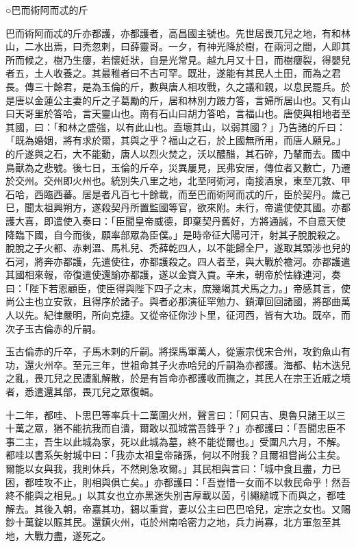 
\begin{pinyinscope}

 ○巴而術阿而忒的斤



 巴而術阿而忒的斤亦都護，亦都護者，高昌國主號也。先世居畏兀兒之地，有和林山，二水出焉，曰禿忽剌，曰薛靈哥。一夕，有神光降於樹，在兩河之間，人即其所而候之，樹乃生癭，若懷妊狀，自是光常見。越九月又十日，而樹癭裂，得嬰兒者五，土人收養之。其最稚者曰不古可罕。既壯，遂能有其民人土田，而為之君長。傳三十餘君，是為玉倫的斤，數與唐人相攻戰，久之議和親，以息民罷兵。於是唐以金蓮公主妻的斤之子葛勵的斤，居和林別力跛力答，言婦所居山也。又有山曰天哥里於答哈，言天靈山也。南有石山曰胡力答哈，言福山也。唐使與相地者至其國，曰：「和林之盛強，以有此山也。盍壞其山，以弱其國？」乃告諸的斤曰：「既為婚姻，將有求於爾，其與之乎？福山之石，於上國無所用，而唐人願見。」的斤遂與之石，大不能動，唐人以烈火焚之，沃以醲醋，其石碎，乃輦而去。國中鳥獸為之悲號。後七日，玉倫的斤卒，災異屢見，民弗安居，傳位者又數亡，乃遷於交州。交州即火州也。統別失八里之地，北至阿術河，南接酒泉，東至兀敦、甲石哈，西臨西蕃。居是者凡百七十餘載，而至巴而術阿而忒的斤，臣於契丹。歲己巳，聞太祖興朔方，遂殺契丹所置監國等官，欲來附。未行，帝遣使使其國。亦都護大喜，即遣使入奏曰：「臣聞皇帝威德，即棄契丹舊好，方將通誠，不自意天使降臨下國，自今而後，願率部眾為臣僕。」是時帝征大陽可汗，射其子脫脫殺之。脫脫之子火都、赤剌溫、馬札兒、禿薛乾四人，以不能歸全尸，遂取其頭涉也兒的石河，將奔亦都護，先遣使往，亦都護殺之。四人者至，與大戰於襜河。亦都護遣其國相來報，帝復遣使還諭亦都護，遂以金寶入貢。辛未，朝帝於怯綠連河，奏曰：「陛下若恩顧臣，使臣得與陛下四子之末，庶幾竭其犬馬之力。」帝感其言，使尚公主也立安敦，且得序於諸子。與者必那演征罕勉力、鎖潭回回諸國，將部曲萬人以先。紀律嚴明，所向克捷。又從帝征你沙卜里，征河西，皆有大功。既卒，而次子玉古倫赤的斤嗣。



 玉古倫赤的斤卒，子馬木剌的斤嗣。將探馬軍萬人，從憲宗伐宋合州，攻釣魚山有功，還火州卒。至元三年，世祖命其子火赤哈兒的斤嗣為亦都護。海都、帖木迭兒之亂，畏兀兒之民遭亂解散，於是有旨命亦都護收而撫之，其民人在宗王近戚之境者，悉遣還其部，畏兀兒之眾復輯。



 十二年，都哇、卜思巴等率兵十二萬圍火州，聲言曰：「阿只吉、奧魯只諸王以三十萬之眾，猶不能抗我而自潰，爾敢以孤城當吾鋒乎？」亦都護曰：「吾聞忠臣不事二主，吾生以此城為家，死以此城為墓，終不能從爾也。」受圍凡六月，不解。都哇以書系矢射城中曰：「我亦太祖皇帝諸孫，何以不附我？且爾祖嘗尚公主矣。爾能以女與我，我則休兵，不然則急攻爾。」其民相與言曰：「城中食且盡，力已困，都哇攻不止，則相與俱亡矣。」亦都護曰：「吾豈惜一女而不以救民命乎！然吾終不能與之相見。」以其女也立亦黑迷失別吉厚載以茵，引繩縋城下而與之，都哇解去。其後入朝，帝嘉其功，錫以重賞，妻以公主曰巴巴哈兒，定宗之女也。又賜鈔十萬錠以賑其民。還鎮火州，屯於州南哈密力之地，兵力尚寡，北方軍忽至其地，大戰力盡，遂死之。




\end{pinyinscope}
